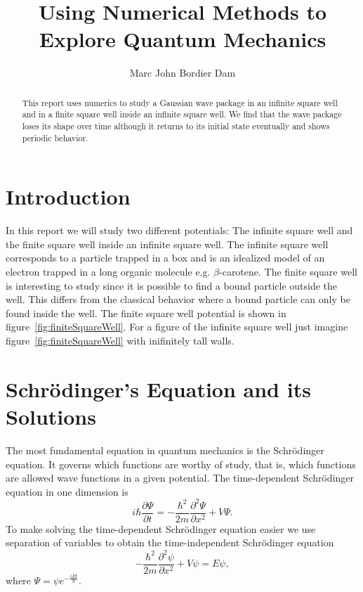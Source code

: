 \documentclass[12pt,a4paper]{article}
\author{Marc John Bordier Dam}
\title{Using Numerical Methods to Explore Quantum Mechanics}
\newcommand{\pdiff}[2]{\frac{\partial #1}{\partial #2}}
\newcommand{\pdiffn}[3]{\frac{\partial^{#3} #1}{\partial #2^{#3}}}
\begin{document}
\maketitle

\begin{abstract}
This report uses numerics to study a Gaussian wave package in an infinite square well and in a finite square well inside an infinite square well. We find that the wave package loses its shape over time although it returns to its initial state eventually and shows periodic behavior.
\end{abstract}

\tableofcontents

\section{Introduction}
In this report we will study two different potentials: The infinite square well and the finite square well inside an infinite square well. The infinite square well corresponds to a particle trapped in a box and is an idealized model of an electron trapped in a long organic molecule e.g. $\beta$-carotene. The finite square well is interesting to study since it is possible to find a bound particle outside the well. This differs from the classical behavior where a bound particle can only be found inside the well. The finite square well potential is shown in figure~\ref{fig:finiteSquareWell}. For a figure of the infinite square well just imagine figure~\ref{fig:finiteSquareWell} with inifinitely tall walls.

\section{Schrödinger's Equation and its Solutions}
The most fundamental equation in quantum mechanics is the Schrödinger equation. It governs which functions are worthy of study, that is, which functions are allowed wave functions in a given potential. The time-dependent Schrödinger equation in one dimension is
\begin{equation}
i \hbar \pdiff{\Psi}{t} = - \frac{\hbar^2}{2 m} \pdiffn{\Psi}{x}{2} + V \Psi.
\end{equation}
To make solving the time-dependent Schrödinger equation easier we use separation of variables to obtain the time-independent Schrödinger equation
\begin{equation}
- \frac{\hbar^2}{2 m} \pdiffn{\psi}{x}{2} + V \psi = E \psi,
\end{equation}
where $\Psi = \psi e^{-\frac{i E t}{\hbar}}$.
\end{document}

